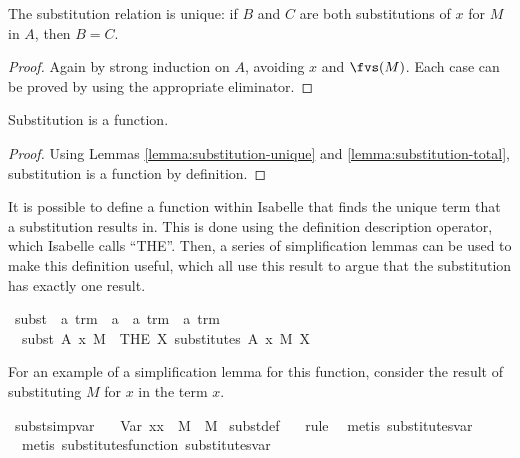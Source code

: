 \begin{lemma}
\label{lemma:substitution-unique}
The substitution relation is unique: if \(B\) and \(C\) are both substitutions of \(x\) for \(M\) in \(A\), then \(B = C\).
\end{lemma}
\begin{proof}
Again by strong induction on \(A\), avoiding \(x\) and \(\fvs(M)\).
Each case can be proved by using the appropriate eliminator.
\end{proof}

\begin{lemma}
Substitution is a function.
\end{lemma}
\begin{proof}
Using Lemmas \ref{lemma:substitution-unique} and \ref{lemma:substitution-total}, substitution is a function by definition.
\end{proof}

It is possible to define a function within Isabelle that finds the unique term that a substitution results in.
This is done using the definition description operator, which Isabelle calls ``THE''.
Then, a series of simplification lemmas can be used to make this definition useful, which all use this result to argue that the substitution has exactly one result.

\begin{implementation}
\isamarkupfalse%
\ subst\ {\isacharcolon}{\isacharcolon}\ {\isachardoublequoteopen}{\isacharprime}a\ trm\ {\isasymRightarrow}\ {\isacharprime}a\ {\isasymRightarrow}\ {\isacharprime}a\ trm\ {\isasymRightarrow}\ {\isacharprime}a\ trm{\isachardoublequoteclose}\ {\isacharparenleft}{\isachardoublequoteopen}{\isacharunderscore}{\isacharbrackleft}{\isacharunderscore}\ {\isacharcolon}{\isacharcolon}{\isacharequal}\ {\isacharunderscore}{\isacharbrackright}{\isachardoublequoteclose}{\isacharparenright}\ \isanewline
\ \ {\isachardoublequoteopen}subst\ A\ x\ M\ {\isasymequiv}\ {\isacharparenleft}THE\ X{\isachardot}\ substitutes\ A\ x\ M\ X{\isacharparenright}{\isachardoublequoteclose}\isanewline
\end{implementation}

For an example of a simplification lemma for this function, consider the result of substituting \(M\) for \(x\) in the term \(x\).

\begin{implementation}
\isamarkupfalse%
\ subst{\isacharunderscore}simp{\isacharunderscore}var{}{\isacharcolon}\isanewline
\ \ \ {\isachardoublequoteopen}{\isacharparenleft}Var\ x{\isacharparenright}{\isacharbrackleft}x\ {\isacharcolon}{\isacharcolon}{\isacharequal}\ M{\isacharbrackright}\ {\isacharequal}\ M{\isachardoublequoteclose}\isanewline
\isatagproof
{}\isamarkupfalse%
\ subst{\isacharunderscore}def\ \isamarkupfalse%
{\isacharparenleft}\isanewline
\ \ rule{\isacharcomma}\isanewline
\ \ metis\ substitutes{\isachardot}var{}{\isacharcomma}\isanewline
\ \ metis\ substitutes{\isacharunderscore}function\ substitutes{\isachardot}var{}\isanewline
{\isacharparenright}%
\end{implementation}

